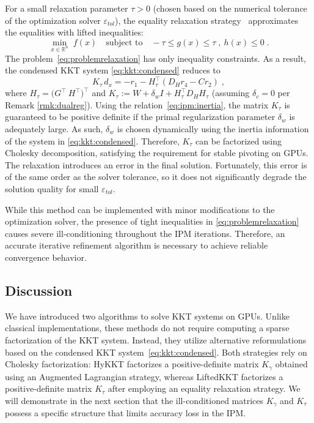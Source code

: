 For a small relaxation parameter $\tau > 0$ (chosen based on the numerical tolerance of the optimization solver $\varepsilon_{tol}$), the equality relaxation strategy~\cite{shin2023accelerating} approximates the equalities with lifted inequalities:
\begin{equation}
  \label{eq:problemrelaxation}
    \min_{x \in \mathbb{R}^n} \;  f(x)
\quad \text{subject to}\quad
     - \tau \leq g(x) \leq \tau \;,~  h(x) \leq 0  \; .
\end{equation}
The problem~\eqref{eq:problemrelaxation} has only inequality constraints. As
a result, the condensed KKT system \eqref{eq:kkt:condensed} reduces to
\begin{equation}
  \label{eq:liftedkkt}
    K_\tau \,d_x = - r_1 - H_\tau^\top(D_H r_4 - C r_2) \; ,
\end{equation}
where $H_\tau = \big(G^\top ~ H^\top\big)^\top$ and
$K_\tau := W + \delta_w I + H_\tau^\top D_H H_\tau$ (assuming $\delta_c=0$ per Remark \ref{rmk:dualreg}). Using the relation~\eqref{eq:ipm:inertia}, the matrix $K_\tau$
is guaranteed to be positive definite if the primal regularization parameter
$\delta_w$ is adequately large. As such, $\delta_w$ is chosen dynamically
using the inertia information of the system in \eqref{eq:kkt:condensed}.
Therefore, $K_\tau$ can be factorized using Cholesky decomposition,
satisfying the requirement for stable pivoting on GPUs.
The relaxation introduces an error in the final solution. Fortunately,
this error is of the same order as the solver tolerance, so it does not
significantly degrade the solution quality for small $\varepsilon_{tol}$.

While this method can be implemented with minor modifications to the
optimization solver, the presence of tight inequalities in
\eqref{eq:problemrelaxation} causes severe ill-conditioning throughout the
IPM iterations. Therefore, an accurate iterative refinement algorithm
is necessary to achieve reliable convergence behavior.


\subsection{Discussion}
We have introduced two algorithms to solve KKT systems on GPUs.
Unlike classical implementations, these methods do not require computing a
sparse \lblt factorization of the KKT system. Instead, they utilize alternative
reformulations based on the condensed KKT system~\eqref{eq:kkt:condensed}.
Both strategies rely on Cholesky factorization: HyKKT factorizes a
positive-definite matrix $K_\gamma$ obtained using an Augmented Lagrangian strategy,
whereas LiftedKKT factorizes a positive-definite matrix $K_\tau$ after employing an equality relaxation strategy.
We will demonstrate in the next section that the ill-conditioned matrices
$K_\gamma$ and $K_\tau$ possess a specific structure that limits accuracy loss in the IPM.



